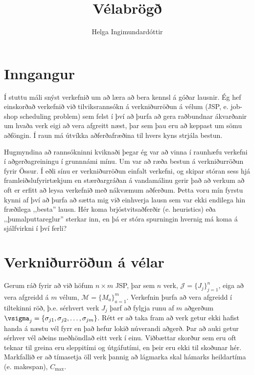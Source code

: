 \documentclass[]{article}
\title{Vélabrögð}
\author{Helga Ingimundardóttir}
\begin{document}
\maketitle


\section{Inngangur}
Í stuttu máli snýst verkefnið um að læra að bera kennsl á góðar lausnir. 
Ég hef einskorðað verkefnið við tilviksrannsókn á verkniðurröðun á vélum (JSP, 
e. job-shop scheduling problem) 
sem felst í því að þurfa að gera raðbundnar ákvarðanir um hvaða verk eigi 
að vera afgreitt næst, þar sem þau eru að keppast um sömu aðföngin.
Í raun má útvíkka aðferðafræðina til hvers kyns strjála bestun. 

Hugmyndina að rannsókninni kviknaði þegar ég var að vinna í raunhæfu verkefni í 
aðgerðagreiningu í grunnnámi mínu. Um var að ræða bestun á verkniðurröðun fyrir 
Össur. Í eðli sínu er verkniðurröðun einfalt verkefni, og skipar stóran sess 
hjá framleiðslufyrirtækjum en stærðargráðan á vandamálinu gerir það að verkum 
að oft er erfitt að leysa verkefnið með nákvæmum aðferðum. 
Þetta voru mín fyrstu kynni af því að þurfa að sætta mig við einhverja lausn 
sem var ekki endilega hin fræðilega ,,besta'' lausn. 
Hér koma brjóstvitsaðferðir (e. heuristics) eða ,,þumalputtareglur'' sterkar 
inn, en þá er stóra spurningin hvernig má koma á sjálfvirkni í því ferli?

\section{Verkniðurröðun á vélar}
Gerum ráð fyrir að við höfum $n\times m$ JSP, 
þar sem $n$ verk, $\mathcal{J}=\{J_j\}_{j=1}^n$, 
eiga að vera afgreidd á $m$ vélum, $\mathcal{M}=\{M_a\}_{a=1}^m$. 
Verkefnin þurfa að vera afgreidd í tiltekinni röð, þ.e. sérhvert verk $J_j$ 
þarf að fylgja runu af $m$ aðgerðum 
$\vsigma_j=\{\sigma_{j1},\sigma_{j2},\dotsc,\sigma_{jm}\}$. 
Rétt er að taka fram að verk getur ekki hafist handa á næstu vél fyrr en það 
hefur lokið núverandi aðgerð. 
Þar að auki getur sérhver vél aðeins meðhöndlað eitt verk í einu. 
Viðbættar skorður sem eru oft teknar til greina eru sleppitími og útgáfutími, 
en þeir eru ekki til skoðunar hér.
Markfallið er að tímasetja öll verk þannig að lágmarka skal hámarks heildartíma 
(e. makespan), $C_{\max}$. 
\end{document}
